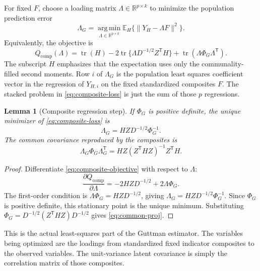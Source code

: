 \documentclass[11pt]{article}
\newcommand{\T}{^{\mathsf T}}
\newcommand{\E}{\mathbb{E}}
\newcommand{\tr}{\operatorname{tr}}
\newcommand{\argmin}{\operatorname*{arg\,min}}
\theoremstyle{plain}
\newtheorem{lemma}{Lemma}
\theoremstyle{remark}
\begin{document}
For fixed \(F\), choose a loading matrix \(\Lambda\in\mathbb R^{p\times k}\) to
minimize the population prediction error
\begin{equation}\label{eq:composite-loss}
  \Lambda_G
  =
  \argmin_{\Lambda\in\mathbb R^{p\times k}}
  \E_H\{ \lVert Y_H-\Lambda F\rVert^2 \}.
\end{equation}
Equivalently, the objective is
\begin{equation}\label{eq:composite-objective}
  Q_{\mathrm{comp}}(\Lambda)
  =
  \tr(H)-2\tr\{\Lambda D^{-1/2}Z\T H\}
  +\tr(\Lambda\Phi_G\Lambda\T).
\end{equation}
The subscript \(H\) emphasizes that the expectation uses only the
communality-filled second moments. Row \(i\) of \(\Lambda_G\) is the population least
squares coefficient vector in the regression of \(Y_{H,i}\) on the fixed
standardized composites \(F\). The stacked problem in \eqref{eq:composite-loss} is just
the sum of those \(p\) regressions.

\begin{lemma}[Composite regression step]\label{lem:regression}
If \(\Phi_G\) is positive definite, the unique minimizer of
\eqref{eq:composite-loss} is
\begin{equation}\label{eq:LambdaG}
  \Lambda_G = HZD^{-1/2}\Phi_G^{-1}.
\end{equation}
The common covariance reproduced by the composites is
\begin{equation}\label{eq:common-proj}
  \Lambda_G\Phi_G\Lambda_G\T
  =
  H Z (Z\T H Z)^{-1} Z\T H .
\end{equation}
\end{lemma}

\begin{proof}
Differentiate \eqref{eq:composite-objective} with respect to \(\Lambda\):
\[
  \frac{\partial Q_{\mathrm{comp}}}{\partial \Lambda}
  =
  -2HZD^{-1/2}+2\Lambda\Phi_G .
\]
The first-order condition is \(\Lambda\Phi_G=HZD^{-1/2}\), giving
\(\Lambda_G=HZD^{-1/2}\Phi_G^{-1}\). Since \(\Phi_G\) is positive definite,
this stationary point is the unique minimum. Substituting
\(\Phi_G=D^{-1/2}(Z\T HZ)D^{-1/2}\) gives \eqref{eq:common-proj}.
\end{proof}

This is the actual least-squares part of the Guttman estimator. The variables
being optimized are the loadings from standardized fixed indicator composites
to the observed variables. The unit-variance latent covariance is simply the
correlation matrix of those composites.
\end{document}
